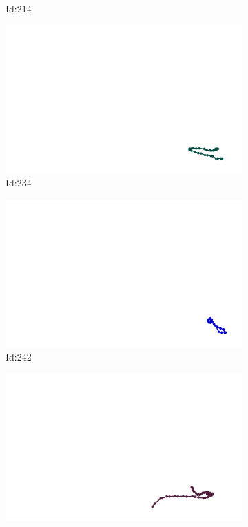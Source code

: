\documentclass[12pt,twoside]{report}
\begin{document}
\begin{figure}
\begin{subfigure}[b]{0.20\textwidth}
\caption{Id:214}
\end{subfigure}
\begin{subfigure}[b]{0.20\textwidth}
\centering
\includegraphics[width=\textwidth]{../trajectories/234.png}
\caption{Id:234}
\end{subfigure}
\begin{subfigure}[b]{0.20\textwidth}
\centering
\includegraphics[width=\textwidth]{../trajectories/242.png}
\caption{Id:242}
\end{subfigure}
\begin{subfigure}[b]{0.20\textwidth}
\centering
\includegraphics[width=\textwidth]{../trajectories/295.png}

\end{subfigure}
\end{figure}
\end{document}
